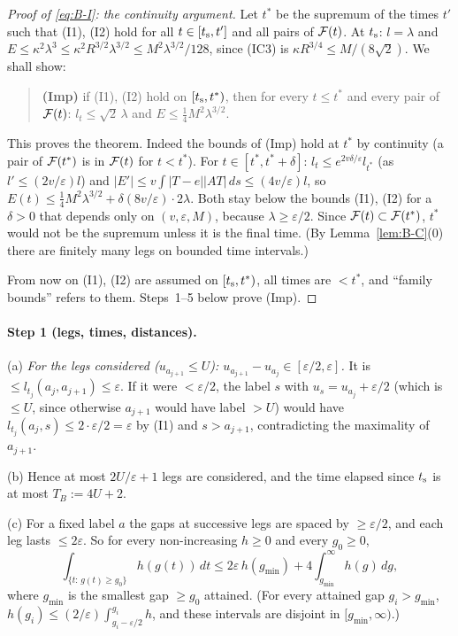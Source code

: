 \begin{proof}[Proof of \eqref{eq:B-I}: the continuity argument]
Let $t^*$ be the supremum of the times $t'$ such that (I1), (I2) hold for all $t\in[t_{\mathrm s},t']$ and all pairs of $\mathcal F(t)$. At $t_{\mathrm s}$:
$l=\lambda$ and $E\le\kappa^2\lambda^3\le\kappa^2R^{3/2}\lambda^{3/2}\le M^2\lambda^{3/2}/128$, since (IC3) is
$\kappa R^{3/4}\le M/(8\sqrt2)$. We shall show:
\begin{quote}
\textbf{(Imp)} if (I1), (I2) hold on $[t_{\mathrm s},t^*)$, then for every $t\le t^*$ and every pair of $\mathcal F(t)$:
$l_t\le\sqrt2\,\lambda$ and $E\le\frac14M^2\lambda^{3/2}$.
\end{quote}
This proves the theorem. Indeed the bounds of (Imp) hold at $t^*$ by continuity (a pair of $\mathcal F(t^*)$ is in $\mathcal F(t)$ for $t<t^*$).
For $t\in[t^*,t^*+\delta]$: $l_t\le e^{2v\delta/\varepsilon}l_{t^*}$ (as $l'\le(2v/\varepsilon)l$) and
$|E'|\le v\int|T-e||AT|\,ds\le(4v/\varepsilon)l$, so $E(t)\le\frac14M^2\lambda^{3/2}+\delta(8v/\varepsilon)\cdot2\lambda$. Both stay
below the bounds (I1), (I2) for a $\delta>0$ that depends only on $(v,\varepsilon,M)$, because $\lambda\ge\varepsilon/2$. Since
$\mathcal F(t)\subset\mathcal F(t^*)$, $t^*$ would not be the supremum unless it is the final time. (By Lemma~\ref{lem:B-C}(0) there are finitely
many legs on bounded time intervals.)

From now on (I1), (I2) are assumed on $[t_{\mathrm s},t^*)$, all times are $<t^*$, and ``family bounds'' refers to them. Steps~1--5 below prove
(Imp).
\end{proof}

\paragraph{Step 1 (legs, times, distances).}
(a) \emph{For the legs considered ($u_{a_{j+1}}\le U$): $u_{a_{j+1}}-u_{a_j}\in[\varepsilon/2,\varepsilon]$.} It is
$\le l_{t_j}(a_j,a_{j+1})\le\varepsilon$. If it were $<\varepsilon/2$, the label $s$ with $u_s=u_{a_j}+\varepsilon/2$ (which is
$\le U$, since otherwise $a_{j+1}$ would have label $>U$) would have $l_{t_j}(a_j,s)\le2\cdot\varepsilon/2=\varepsilon$ by (I1) and
$s>a_{j+1}$, contradicting the maximality of $a_{j+1}$.

(b) Hence at most $2U/\varepsilon+1$ legs are considered, and the time elapsed since $t_{\mathrm s}$ is at most $T_B:=4U+2$.

(c) For a fixed label $a$ the gaps at successive legs are spaced by $\ge\varepsilon/2$, and each leg lasts $\le2\varepsilon$. So for
every non-increasing $h\ge0$ and every $g_0\ge0$,
\begin{equation}\label{eq:B-1c}
\int_{\{t:\,g(t)\ge g_0\}}h(g(t))\,dt\le2\varepsilon\,h(g_{\min})+4\int_{g_{\min}}^\infty h(g)\,dg,
\end{equation}
where $g_{\min}$ is the smallest gap $\ge g_0$ attained. (For every attained gap $g_i>g_{\min}$,
$h(g_i)\le(2/\varepsilon)\int_{g_i-\varepsilon/2}^{g_i}h$, and these intervals are disjoint in $[g_{\min},\infty)$.)

